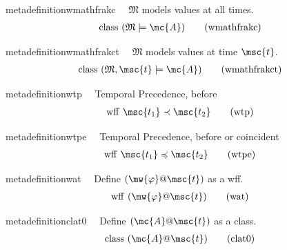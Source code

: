 \begin{restatable}{metadefinition}{wmathfrakc}~~ $\mathfrak{M}$ models values at all
times.
\begin{align}
\,\mathrm{class}~ ( \mathfrak{M} \models \mc{A}
    )\label{eq:wmathfrakc}\tag{wmathfrakc}
\end{align}
\end{restatable}

\begin{restatable}{metadefinition}{wmathfrakct}~~ $\mathfrak{M}$ models values at time
$\msc{t}$.
\begin{align}
\,\mathrm{class}~ ( \mathfrak{M} , \msc{t} \models \mc{A}
    )\label{eq:wmathfrakct}\tag{wmathfrakct}
\end{align}
\end{restatable}

\begin{restatable}{metadefinition}{wtp}~~ Temporal Precedence, before
\begin{align}
\,\mathrm{wff}~ \msc{t_1} \prec \msc{t_2}\label{eq:wtp}\tag{wtp}
\end{align}
\end{restatable}

\begin{restatable}{metadefinition}{wtpe}~~ Temporal Precedence, before or coincident
\begin{align}
\,\mathrm{wff}~ \msc{t_1} \preccurlyeq \msc{t_2}\label{eq:wtpe}\tag{wtpe}
\end{align}
\end{restatable}

\begin{restatable}{metadefinition}{wat}~~ Define $( \mw{\varphi} @ \msc{t} )$ as a
wff.
\begin{align}
\,\mathrm{wff}~ ( \mw{\varphi} @ \msc{t} )\label{eq:wat}\tag{wat}
\end{align}
\end{restatable}

\begin{restatable}{metadefinition}{clat0}~~ Define $( \mc{A} @ \msc{t} )$ as a class.
\begin{align}
\,\mathrm{class}~ ( \mc{A} @ \msc{t} )\label{eq:clat0}\tag{clat0}
\end{align}
\end{restatable}

